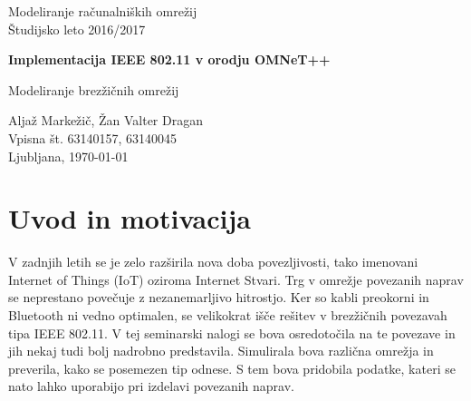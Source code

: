 \documentclass[11pt,a4paper,slovene]{myarticle}
\begin{document}
\label{naslov}
\thispagestyle{empty}

\begin{center}
\begin{Large}
Modeliranje računalniških omrežij\\
Študijsko leto 2016/2017\\
\end{Large}

\vspace*{4cm}
\begin{LARGE}
\textbf{Implementacija IEEE 802.11 v orodju OMNeT++\\}
\end{LARGE}
\vspace*{0.5cm}

\begin{Large}
Modeliranje brezžičnih omrežij\\

\vspace*{4cm}

Aljaž Markežič, Žan Valter Dragan\\
Vpisna št. 63140157, 63140045\\

\vspace*{5cm}
Ljubljana, \today
\end{Large}
\end{center}

\pagebreak
\setcounter{page}{1}


\label{Kazalo}
\tableofcontents
\thispagestyle{empty}
\pagebreak

\section{Uvod in motivacija}
V zadnjih letih se je zelo razširila nova doba povezljivosti, tako imenovani Internet of Things (IoT) oziroma Internet Stvari. Trg v omrežje povezanih naprav se neprestano povečuje z nezanemarljivo hitrostjo. Ker so kabli preokorni in Bluetooth ni vedno optimalen, se velikokrat išče rešitev v brezžičnih povezavah tipa IEEE 802.11. V tej seminarski nalogi se bova osredotočila na te povezave in jih nekaj tudi bolj nadrobno predstavila. Simulirala bova različna omrežja in preverila, kako se posemezen tip odnese. S tem bova pridobila podatke, kateri se nato lahko uporabijo pri izdelavi povezanih naprav.
\end{document}
